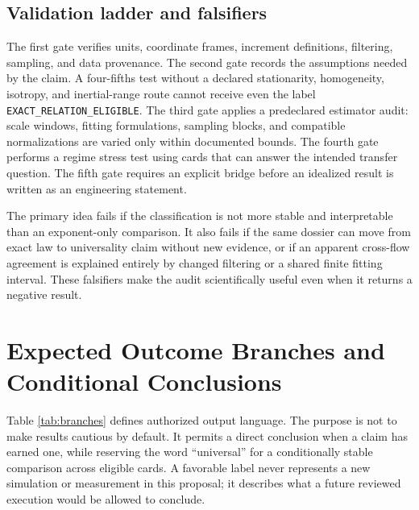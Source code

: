 \documentclass[conference]{../../../../Conference-LaTeX-template_10-17-19/IEEEtran}
\begin{document}
\subsection{Validation ladder and falsifiers}
The first gate verifies units, coordinate frames, increment definitions, filtering, sampling, and data provenance. The second gate records the assumptions needed by the claim. A four-fifths test without a declared stationarity, homogeneity, isotropy, and inertial-range route cannot receive even the label \texttt{EXACT\_RELATION\_ELIGIBLE}. The third gate applies a predeclared estimator audit: scale windows, fitting formulations, sampling blocks, and compatible normalizations are varied only within documented bounds. The fourth gate performs a regime stress test using cards that can answer the intended transfer question. The fifth gate requires an explicit bridge before an idealized result is written as an engineering statement.

The primary idea fails if the classification is not more stable and interpretable than an exponent-only comparison. It also fails if the same dossier can move from exact law to universality claim without new evidence, or if an apparent cross-flow agreement is explained entirely by changed filtering or a shared finite fitting interval. These falsifiers make the audit scientifically useful even when it returns a negative result.

\section{Expected Outcome Branches and Conditional Conclusions}
Table \ref{tab:branches} defines authorized output language. The purpose is not to make results cautious by default. It permits a direct conclusion when a claim has earned one, while reserving the word ``universal'' for a conditionally stable comparison across eligible cards. A favorable label never represents a new simulation or measurement in this proposal; it describes what a future reviewed execution would be allowed to conclude.
\end{document}
